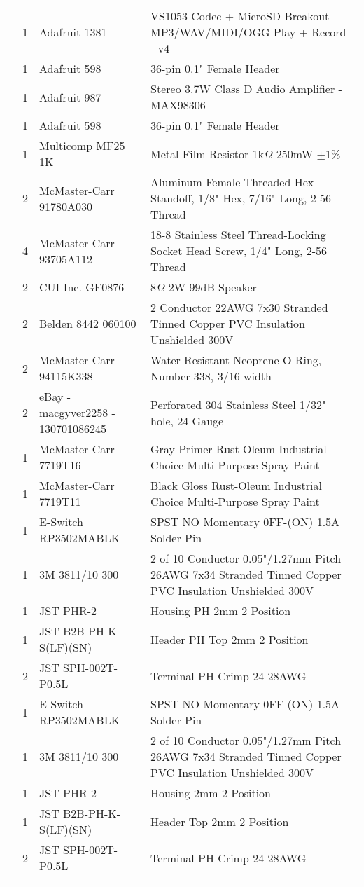 \begin{longtabu}{X[3,c,m] X[1,c,m] X[3,c,m] X[5,l,m]}
   & 1 & Adafruit 1381 & VS1053 Codec + MicroSD Breakout - MP3/WAV/MIDI/OGG Play + Record - v4 \\
  & 1 & Adafruit 598 & 36-pin 0.1" Female Header \\ \mrule

   & 1 & Adafruit 987 & Stereo 3.7W Class D Audio Amplifier - MAX98306 \\
  & 1 & Adafruit 598 & 36-pin 0.1" Female Header \\
  & 1 & Multicomp MF25 1K & Metal Film Resistor 1k$\Omega$ 250mW $\pm$1\% \\
  & 2 & McMaster-Carr 91780A030 & Aluminum Female Threaded Hex Standoff, 1/8" Hex, 7/16" Long, 2-56 Thread \\
  & 4 & McMaster-Carr 93705A112 & 18-8 Stainless Steel Thread-Locking Socket Head Screw, 1/4" Long, 2-56 Thread \\ \mrule

   & 2 & CUI Inc. GF0876 & 8$\Omega$ 2W 99dB Speaker \\
  & 2 & Belden 8442 060100 & 2 Conductor 22AWG 7x30 Stranded Tinned Copper PVC Insulation Unshielded 300V \\
  & 2 & McMaster-Carr 94115K338 & Water-Resistant Neoprene O-Ring, Number 338, 3/16 width \\
  & 2 & eBay - macgyver2258 - 130701086245 & Perforated 304 Stainless Steel 1/32" hole, 24 Gauge \\
  & 1 & McMaster-Carr 7719T16 & Gray Primer Rust-Oleum Industrial Choice Multi-Purpose Spray Paint \\
  & 1 & McMaster-Carr 7719T11 & Black Gloss Rust-Oleum Industrial Choice Multi-Purpose Spray Paint \\ \mrule

   & 1 & E-Switch RP3502MABLK & SPST NO Momentary 0FF-(ON) 1.5A Solder Pin \\
  & 1 & 3M 3811/10 300 & 2 of 10 Conductor 0.05"/1.27mm Pitch 26AWG 7x34 Stranded Tinned Copper PVC Insulation Unshielded 300V \\
  & 1 & JST PHR-2 & Housing PH 2mm 2 Position \\
  & 1 & JST B2B-PH-K-S(LF)(SN) & Header PH Top 2mm 2 Position \\
  & 2 & JST SPH-002T-P0.5L & Terminal PH Crimp 24-28AWG \\ \mrule

   & 1 & E-Switch RP3502MABLK & SPST NO Momentary 0FF-(ON) 1.5A Solder Pin \\
  & 1 & 3M 3811/10 300 & 2 of 10 Conductor 0.05"/1.27mm Pitch 26AWG 7x34 Stranded Tinned Copper PVC Insulation Unshielded 300V \\
  & 1 & JST PHR-2 & Housing 2mm 2 Position \\
  & 1 & JST B2B-PH-K-S(LF)(SN) & Header Top 2mm 2 Position \\
  & 2 & JST SPH-002T-P0.5L & Terminal PH Crimp 24-28AWG \\ \mrule


\end{longtabu}
